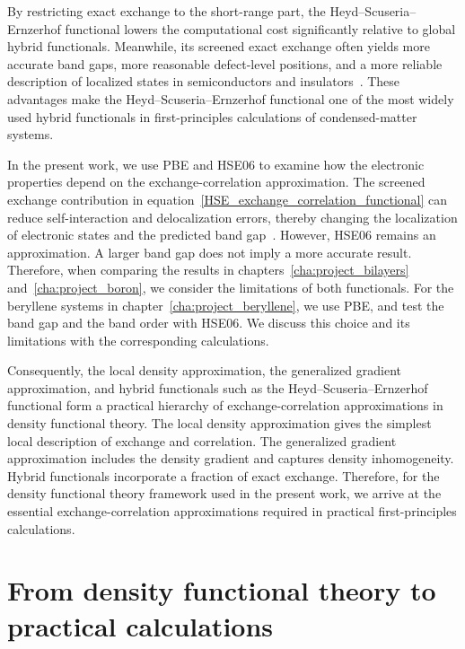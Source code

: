 By restricting exact exchange to the short-range part,
the Heyd--Scuseria--Ernzerhof functional lowers the computational cost significantly relative to global hybrid functionals.
Meanwhile, its screened exact exchange often yields more accurate band gaps,
more reasonable defect-level positions,
and a more reliable description of localized states in semiconductors and insulators~\cite{paier2006screened,krukau2006influence}.
These advantages make the Heyd--Scuseria--Ernzerhof functional one of the most widely used hybrid functionals in first-principles calculations of condensed-matter systems.

In the present work,
we use PBE and HSE06 to examine how the electronic properties depend on the exchange-correlation approximation.
The screened exchange contribution in equation~\eqref{HSE_exchange_correlation_functional}
can reduce self-interaction and delocalization errors,
thereby changing the localization of electronic states and the predicted band gap~\cite{cohen2012challenges}.
However, HSE06 remains an approximation.
A larger band gap does not imply a more accurate result.
Therefore, when comparing the results in chapters~\ref{cha:project_bilayers} and~\ref{cha:project_boron},
we consider the limitations of both functionals.
For the beryllene systems in chapter~\ref{cha:project_beryllene}, we use PBE, and test the band gap and the band order with HSE06.
We discuss this choice and its limitations with the corresponding calculations.

Consequently, the local density approximation,
the generalized gradient approximation,
and hybrid functionals such as the Heyd--Scuseria--Ernzerhof functional form a practical hierarchy of exchange-correlation approximations in density functional theory.
The local density approximation gives the simplest local description of exchange and correlation.
The generalized gradient approximation includes the density gradient and captures density inhomogeneity.
Hybrid functionals incorporate a fraction of exact exchange.
Therefore, for the density functional theory framework used in the present work,
we arrive at the essential exchange-correlation approximations required in practical first-principles calculations.

\newpage
\FloatBarrier
\section{From density functional theory to practical calculations}
\label{sec:practical_computational_methods}

